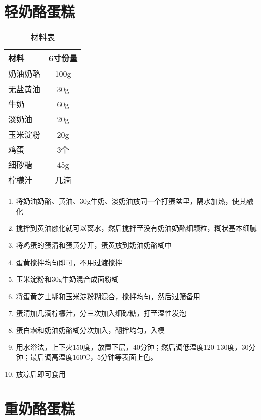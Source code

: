 \section{轻奶酪蛋糕}

\begin{table}[H]
    \centering
    \begin{tabular}{|l||c|}\hline
     \textbf{材料}    &  \textbf{6寸份量}\\ \hline\hline
    奶油奶酪 & 100g \\ \hline
    无盐黄油 & 30g \\ \hline
    牛奶 & 60g\\ \hline
    淡奶油 & 20g \\ \hline
    玉米淀粉 & 20g \\ \hline
    鸡蛋 & 3个  \\ \hline
    细砂糖 & 45g \\ \hline
    柠檬汁 & 几滴 \\ \hline
    \end{tabular}
    \caption{材料表}
\end{table}

\begin{enumerate}
    \item 将奶油奶酪、黄油、30g牛奶、淡奶油放同一个打蛋盆里，隔水加热，使其融化
    \item 搅拌到黄油融化就可以离水，然后搅拌至没有奶油奶酪细颗粒，糊状基本细腻
    \item 将鸡蛋的蛋清和蛋黄分开，蛋黄放到奶油奶酪糊中
    \item 蛋黄搅拌均匀即可，不用过渡搅拌
    \item 玉米淀粉和30g牛奶混合成面粉糊
    \item 将蛋黄芝士糊和玉米淀粉糊混合，搅拌均匀，然后过筛备用
    \item 蛋清加几滴柠檬汁，分三次加入细砂糖，打至湿性发泡
    \item 蛋白霜和奶油奶酪糊分次加入，翻拌均匀，入模
    \item 用水浴法，上下火150度，放置下层，40分钟；然后调低温度120-130度，30分钟；最后调高温度160℃，5分钟等表面上色。
    \item 放凉后即可食用
\end{enumerate}


\section{重奶酪蛋糕}

